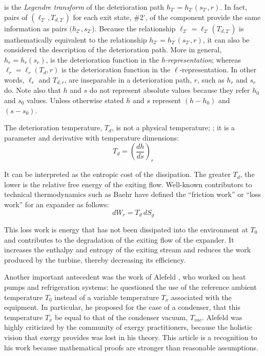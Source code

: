 \documentclass[energies,article,submit,moreauthors,pdftex]{Definitions/mdpi}
\begin{document}
 is the \emph{Legendre transform} of the deterioration path $h_{2'}=h_{2'}(s_{2'},r)$. In fact, pairs of $(\ell_{2'} , T_{d,2'})$ for each exit state, \#2', of the component provide the same information as pairs $(h_{2'},s_{2'}$). Because the relationship  $\ell_{2'} = \ell_{2'}(T_{d,2'})$ is mathematically equivalent to the relationship $h_{2'} = h_{2'} (s_{2'}, r)$, it can also be considered the description of the deterioration path. More in general, $h_r=h_r (s_r)$, is the deterioration function in the \emph{h-representation}; whereas $\ell_r = \ell_r(T_d,r)$ is the deterioration function in the $\ell$-representation. In other words, $\ell_r$ and $T_{d,r}$, are inseparable in a deterioration path, $r$, such as $h_r$ and $s_r$ do. Note also that $h$ and $s$ do not represent absolute values because they refer $h_0$ and $s_0$ values. Unless otherwise stated $h$ and $s$ represent $(h-h_0)$ and $(s-s_0)$.

The deterioration temperature, $T_d$, is not a physical temperature; ; it is a parameter and derivative with temperature dimensions:  
\begin{equation}
T_d=\left(\frac{dh}{ds}\right)_r
\end{equation}      

It can be interpreted as the entropic cost of the dissipation. The greater $T_d$, the lower is the relative free energy of the exiting flow.
Well-known contributors to technical thermodynamics such as Baehr \cite{Baehr2005,Baehr1979} have defined the “friction work” or “loss work” for an expander as follows: 
\begin{equation}
	dW_r=T_d\,dS_g
\end{equation}

This loss work is energy that has not been dissipated into the environment at $T_0$ and contributes to the degradation of the exiting flow of the expander. It increases the enthalpy and entropy of the exiting stream and reduces the work produced by the turbine, thereby decreasing its efficiency.

Another important antecedent was the work of Alefeld \cite{Alefeld1988}, who worked on heat pumps and refrigeration systems: he questioned the use of the reference ambient temperature $T_0$ instead of a variable temperature $T_x$ associated with the equipment. In particular, he proposed for the case of a condenser, that this temperature $T_x$ be equal to that of the condenser vacuum, $T_{vac}$. Alefeld was highly criticized by the community of exergy practitioners, because the holistic vision that exergy provides was lost in his theory. This article is a recognition to his work because mathematical proofs are stronger than reasonable assumptions.
\end{document}
